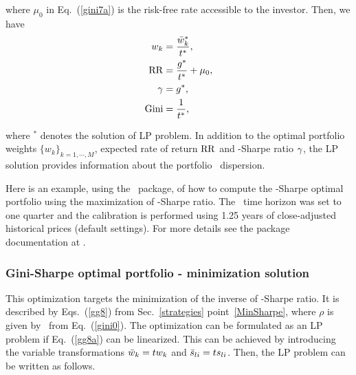 \noindent where $\mu_0$ in Eq.~(\ref{gini7a}) is the
risk-free rate accessible to the investor.
Then, we have
\begin{subequations}\label{gini8}
\begin{align}
    w_k &= \frac{\bw_k^*}{t^*} , \label{gini8a} \\
    \RR &= \frac{g^*}{t^*} + \mu_0, \label{gini8c} \\
    \Sharpe &= g^*, \label{gini8b} \\
    \GINI &= \frac{1}{t^*}, \label{gini8d}
\end{align}
\end{subequations}

\noindent where $^*$ denotes the solution of LP problem.
In addition to the optimal portfolio weights $\{w_k\}_{k=1,\cdots,M}$, expected rate of return ${\rm RR}$ and
\GINI-Sharpe ratio ${\gamma}$,
the LP solution provides information about the portfolio \GINI\ dispersion.

\bigskip
\noindent Here is an example, using the \azapy\ package, of how to compute the \GINI-Sharpe optimal portfolio using the maximization
of \GINI-Sharpe ratio.
The \GINI\ time horizon was set to one quarter and the calibration is performed using 1.25 years of
close-adjusted historical prices (default settings).
For more details see the package documentation at \azapydoc.



\BackToContents


\subsubsection{Gini-Sharpe optimal portfolio - minimization solution}
This optimization targets the minimization of the inverse of \GINI-Sharpe ratio.
It is  described by Eqs.~(\ref{gg8}) from Sec.~\ref{strategies} point~\ref{MinSharpe}, where
$\rho$ is given by \GINI\ from Eq.~(\ref{gini0}).
The optimization can be formulated as an LP problem if Eq.~(\ref{gg8a}) can be linearized. This can be achieved by
introducing the variable transformations
${\bar w}_k = t w_k$ and ${\bar s}_{li} = t s_{li}$.
Then, the LP problem can be written as follows.

